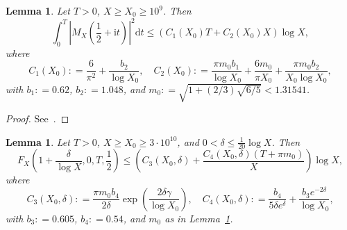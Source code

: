 \documentclass[a4paper,reqno]{amsart}
\newtheorem{lemma}[theorem]{Lemma}
\theoremstyle{definition}
\newcommand{\de}[0]{\mathrel{\mathop:}=}
\newcommand{\ie}[0]{\mathrm{i}}
\newcommand{\dif}[1]{\mathrm{d}#1}
\begin{document}
\begin{lemma}
\label{lem:Mxone_half}
Let $T>0$, $X\geq X_{0}\geq 10^{9}$. Then 
\begin{equation*}
\int_{0}^{T} \left|M_{X}\left(\frac{1}{2} + \ie t\right)\right|^{2} \dif{t} \leq \left(C_{1}(X_0)T + C_{2}(X_0)X\right)\log{X},
\end{equation*}
where 
\begin{equation*}
C_{1}(X_0) \de \frac{6}{\pi^{2}} + \frac{b_{2}}{\log X_{0}}, \quad C_{2}(X_0) \de \frac{\pi m_{0} b_{1}}{\log X_{0}} + \frac{6 m_{0}}{ \pi X_{0}} + \frac{\pi m_{0} b_{2}}{ X_{0} \log X_{0}},
\end{equation*}
with $b_{1}\de 0.62$, $b_{2}\de 1.048$, and $m_0\de \sqrt{1+(2/3)\sqrt{6/5}}<1.31541$.
\end{lemma}

\begin{proof}
See~\cite[Lemma 4.1]{KADIRI201822}.
\end{proof}

\begin{lemma}
\label{lem:fxone}
Let $T>0$, $X\geq X_{0}\geq 3\cdot10^{10}$, and $0<\delta\leq \frac{1}{20}\log{X}$. Then
\begin{equation*}
F_{X}\left(1+ \frac{\delta}{\log X},0,T,\frac{1}{2}\right) \leq  \left( C_{3}(X_0,\delta) + \frac{C_{4}(X_0,\delta)\left(T+\pi m_{0}\right)}{X}\right) \log {X}, 
\end{equation*}
where 
\begin{equation*} 
C_{3}(X_0,\delta) \de \frac{\pi m_{0}b_4}{2\delta}\exp{\left(\frac{2\delta\gamma}{\log{X_0}}\right)}, \quad
 C_{4}(X_0,\delta) \de \frac{b_{4}}{5\delta e^{\delta}}  + \frac{b_{3}e^{-2 \delta}}{\log{X_{0}}},
\end{equation*}
with $b_{3}\de 0.605$, $b_{4}\de 0.54$, and $m_0$ as in Lemma~\ref{lem:Mxone_half}.
\end{lemma}
\end{document}
